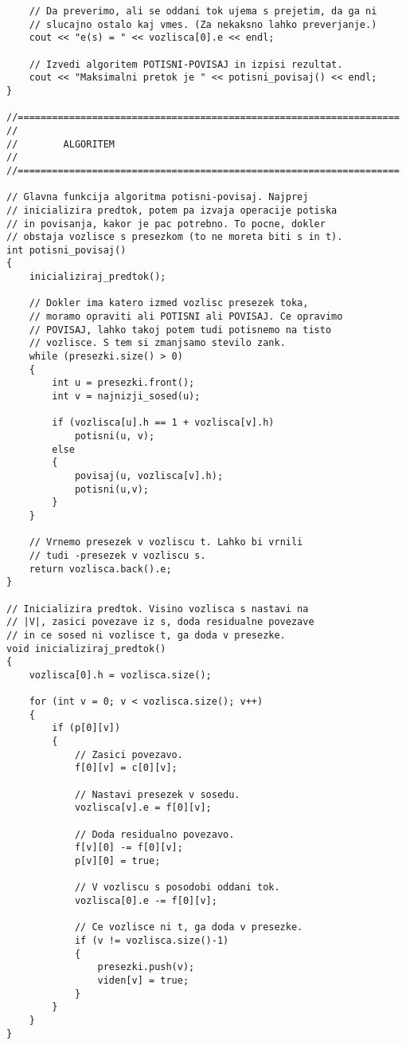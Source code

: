 \documentclass[mat1]{fmfdelo}
\begin{document}
\begin{verbatim}
    // Da preverimo, ali se oddani tok ujema s prejetim, da ga ni
    // slucajno ostalo kaj vmes. (Za nekaksno lahko preverjanje.)
    cout << "e(s) = " << vozlisca[0].e << endl;
    
    // Izvedi algoritem POTISNI-POVISAJ in izpisi rezultat.
    cout << "Maksimalni pretok je " << potisni_povisaj() << endl;
}

//===================================================================
//
//        ALGORITEM
//
//===================================================================

// Glavna funkcija algoritma potisni-povisaj. Najprej
// inicializira predtok, potem pa izvaja operacije potiska
// in povisanja, kakor je pac potrebno. To pocne, dokler
// obstaja vozlisce s presezkom (to ne moreta biti s in t).
int potisni_povisaj()
{
    inicializiraj_predtok();
    
    // Dokler ima katero izmed vozlisc presezek toka,
    // moramo opraviti ali POTISNI ali POVISAJ. Ce opravimo
    // POVISAJ, lahko takoj potem tudi potisnemo na tisto
    // vozlisce. S tem si zmanjsamo stevilo zank.
    while (presezki.size() > 0)
    {
        int u = presezki.front();
        int v = najnizji_sosed(u);
        
        if (vozlisca[u].h == 1 + vozlisca[v].h)
            potisni(u, v);
        else
        {
            povisaj(u, vozlisca[v].h);
            potisni(u,v);
        }
    }
    
    // Vrnemo presezek v vozliscu t. Lahko bi vrnili
    // tudi -presezek v vozliscu s.
    return vozlisca.back().e;
}

// Inicializira predtok. Visino vozlisca s nastavi na
// |V|, zasici povezave iz s, doda residualne povezave
// in ce sosed ni vozlisce t, ga doda v presezke.
void inicializiraj_predtok()
{
    vozlisca[0].h = vozlisca.size();
    
    for (int v = 0; v < vozlisca.size(); v++)
    {
        if (p[0][v])
        {
            // Zasici povezavo.
            f[0][v] = c[0][v];
        
            // Nastavi presezek v sosedu.
            vozlisca[v].e = f[0][v];
        
            // Doda residualno povezavo.
            f[v][0] -= f[0][v];
            p[v][0] = true;
        
            // V vozliscu s posodobi oddani tok.
            vozlisca[0].e -= f[0][v];
        
            // Ce vozlisce ni t, ga doda v presezke.
            if (v != vozlisca.size()-1)
            {
                presezki.push(v);
                viden[v] = true;
            }
        }
    }
}


\end{verbatim}
\end{document}
